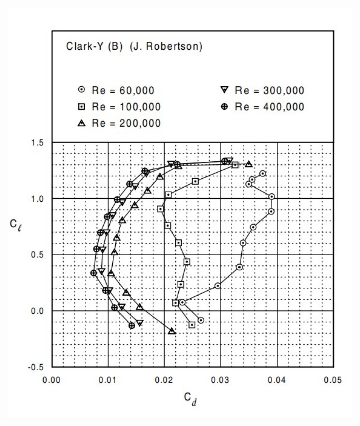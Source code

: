 \documentclass[runningheads]{llncs}
\begin{document}
\begin{figure}[h]
    \centering
    \begin{subfigure}[b]{0.45\textwidth}
         \centering
         \includegraphics[width=\textwidth]{figures/clark_y_reference_cl_cd.jpg}
         \caption{}
         \label{fig:reference_cl_cd}
     \end{subfigure}
     \begin{subfigure}[b]{0.45\textwidth}
         \centering

\end{subfigure}
\end{figure}
\end{document}
